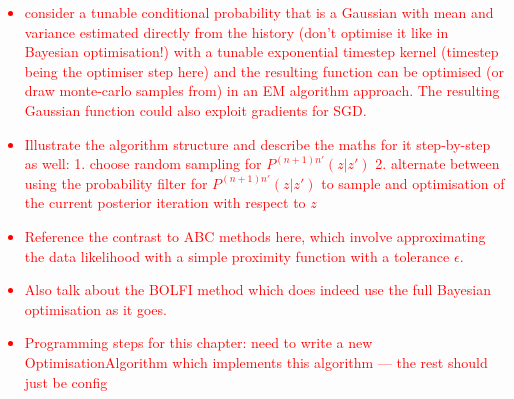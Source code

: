 \textcolor{red}{\begin{itemize}
\item{consider a tunable conditional probability that is a Gaussian with mean and variance estimated directly from the history (don't optimise it like in Bayesian optimisation!) with a tunable exponential timestep kernel (timestep being the optimiser step here) and the resulting function can be optimised (or draw monte-carlo samples from) in an EM algorithm approach. The resulting Gaussian function could also exploit gradients for SGD.}
\item{Illustrate the algorithm structure and describe the maths for it step-by-step as well: 1. choose random sampling for $P^{(n+1)n'}(z\vert z')$ 2. alternate between using the probability filter for $P^{(n+1)n'}(z\vert z')$ to sample and optimisation of the current posterior iteration with respect to $z$}
\item{Reference the contrast to ABC methods here, which involve approximating the data likelihood with a simple proximity function with a tolerance $\epsilon$.}
\item{Also talk about the BOLFI method which does indeed use the full Bayesian optimisation as it goes.}
\item{Programming steps for this chapter: need to write a new OptimisationAlgorithm which implements this algorithm --- the rest should just be config}
\end{itemize}}

